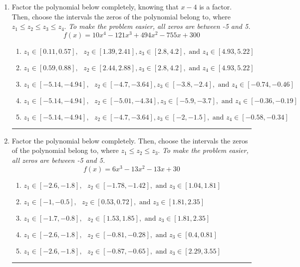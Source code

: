 \documentclass[14pt]{extbook}
\newcommand{\litem}[1]{\item#1\hspace*{-1cm}\rule{\textwidth}{0.4pt}}
\begin{document}
\begin{enumerate}
{\begin{enumerate}[label=\Alph*.]
\end{enumerate} }
\litem{
Factor the polynomial below completely, knowing that $x-4$ is a factor. Then, choose the intervals the zeros of the polynomial belong to, where $z_1 \leq z_2 \leq z_3 \leq z_4$. \textit{To make the problem easier, all zeros are between -5 and 5.}\[ f(x) = 10x^{4} -121 x^{3} +494 x^{2} -755 x + 300 \]\begin{enumerate}[label=\Alph*.]
\item \( z_1 \in [0.11, 0.57], \text{   }  z_2 \in [1.39, 2.41], z_3 \in [2.8, 4.2], \text{   and   } z_4 \in [4.93, 5.22] \)
\item \( z_1 \in [0.59, 0.88], \text{   }  z_2 \in [2.44, 2.88], z_3 \in [2.8, 4.2], \text{   and   } z_4 \in [4.93, 5.22] \)
\item \( z_1 \in [-5.14, -4.94], \text{   }  z_2 \in [-4.7, -3.64], z_3 \in [-3.8, -2.4], \text{   and   } z_4 \in [-0.74, -0.46] \)
\item \( z_1 \in [-5.14, -4.94], \text{   }  z_2 \in [-5.01, -4.34], z_3 \in [-5.9, -3.7], \text{   and   } z_4 \in [-0.36, -0.19] \)
\item \( z_1 \in [-5.14, -4.94], \text{   }  z_2 \in [-4.7, -3.64], z_3 \in [-2, -1.5], \text{   and   } z_4 \in [-0.58, -0.34] \)

\end{enumerate} }
\litem{
Factor the polynomial below completely. Then, choose the intervals the zeros of the polynomial belong to, where $z_1 \leq z_2 \leq z_3$. \textit{To make the problem easier, all zeros are between -5 and 5.}\[ f(x) = 6x^{3} -13 x^{2} -13 x + 30 \]\begin{enumerate}[label=\Alph*.]
\item \( z_1 \in [-2.6, -1.8], \text{   }  z_2 \in [-1.78, -1.42], \text{   and   } z_3 \in [1.04, 1.81] \)
\item \( z_1 \in [-1, -0.5], \text{   }  z_2 \in [0.53, 0.72], \text{   and   } z_3 \in [1.81, 2.35] \)
\item \( z_1 \in [-1.7, -0.8], \text{   }  z_2 \in [1.53, 1.85], \text{   and   } z_3 \in [1.81, 2.35] \)
\item \( z_1 \in [-2.6, -1.8], \text{   }  z_2 \in [-0.81, -0.28], \text{   and   } z_3 \in [0.4, 0.81] \)
\item \( z_1 \in [-2.6, -1.8], \text{   }  z_2 \in [-0.87, -0.65], \text{   and   } z_3 \in [2.29, 3.55] \)

\end{enumerate} }
\end{enumerate}
\end{document}
